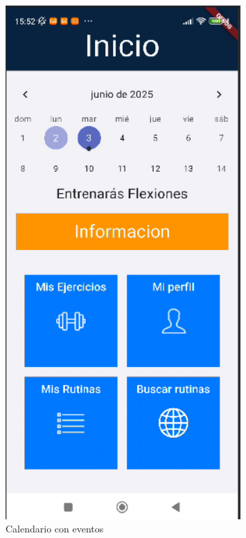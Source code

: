 \begin{figure}[H]
   \centering
    \includegraphics[width=0.8\textwidth]{pantallas/CalendarioEventos.png}
    \caption{Calendario con eventos}
    \label{fig:CalendarioEventos}
\end{figure}

